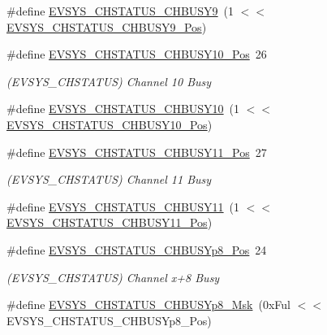 \begin{DoxyCompactItemize}
\#define \mbox{\hyperlink{group___s_a_m_d21___e_v_s_y_s_ga8ad1d75c07d64dc3f21cefb3f808aec1}{E\+V\+S\+Y\+S\+\_\+\+C\+H\+S\+T\+A\+T\+U\+S\+\_\+\+C\+H\+B\+U\+S\+Y9}}~(1 $<$$<$ \mbox{\hyperlink{group___s_a_m_d21___e_v_s_y_s_gaab28b2cfe9e5f4adcdd0537d485835e2}{E\+V\+S\+Y\+S\+\_\+\+C\+H\+S\+T\+A\+T\+U\+S\+\_\+\+C\+H\+B\+U\+S\+Y9\+\_\+\+Pos}})
\item 
\#define \mbox{\hyperlink{group___s_a_m_d21___e_v_s_y_s_gaef16f98ea1ecf706c13aaab54a8f89ee}{E\+V\+S\+Y\+S\+\_\+\+C\+H\+S\+T\+A\+T\+U\+S\+\_\+\+C\+H\+B\+U\+S\+Y10\+\_\+\+Pos}}~26
\begin{DoxyCompactList}\small\item\em (E\+V\+S\+Y\+S\+\_\+\+C\+H\+S\+T\+A\+T\+US) Channel 10 Busy \end{DoxyCompactList}\item 
\#define \mbox{\hyperlink{group___s_a_m_d21___e_v_s_y_s_ga1d8c6c70bd3bb364a53e98413c3f4a9a}{E\+V\+S\+Y\+S\+\_\+\+C\+H\+S\+T\+A\+T\+U\+S\+\_\+\+C\+H\+B\+U\+S\+Y10}}~(1 $<$$<$ \mbox{\hyperlink{group___s_a_m_d21___e_v_s_y_s_gaef16f98ea1ecf706c13aaab54a8f89ee}{E\+V\+S\+Y\+S\+\_\+\+C\+H\+S\+T\+A\+T\+U\+S\+\_\+\+C\+H\+B\+U\+S\+Y10\+\_\+\+Pos}})
\item 
\#define \mbox{\hyperlink{group___s_a_m_d21___e_v_s_y_s_gac35df61c7dbaba4a51ca27ce046f63a5}{E\+V\+S\+Y\+S\+\_\+\+C\+H\+S\+T\+A\+T\+U\+S\+\_\+\+C\+H\+B\+U\+S\+Y11\+\_\+\+Pos}}~27
\begin{DoxyCompactList}\small\item\em (E\+V\+S\+Y\+S\+\_\+\+C\+H\+S\+T\+A\+T\+US) Channel 11 Busy \end{DoxyCompactList}\item 
\#define \mbox{\hyperlink{group___s_a_m_d21___e_v_s_y_s_ga4d141cd748445ac8d2982ab72a2016ce}{E\+V\+S\+Y\+S\+\_\+\+C\+H\+S\+T\+A\+T\+U\+S\+\_\+\+C\+H\+B\+U\+S\+Y11}}~(1 $<$$<$ \mbox{\hyperlink{group___s_a_m_d21___e_v_s_y_s_gac35df61c7dbaba4a51ca27ce046f63a5}{E\+V\+S\+Y\+S\+\_\+\+C\+H\+S\+T\+A\+T\+U\+S\+\_\+\+C\+H\+B\+U\+S\+Y11\+\_\+\+Pos}})
\item 
\#define \mbox{\hyperlink{group___s_a_m_d21___e_v_s_y_s_gada12b1644128aac2e79ed2ba3faeab27}{E\+V\+S\+Y\+S\+\_\+\+C\+H\+S\+T\+A\+T\+U\+S\+\_\+\+C\+H\+B\+U\+S\+Yp8\+\_\+\+Pos}}~24
\begin{DoxyCompactList}\small\item\em (E\+V\+S\+Y\+S\+\_\+\+C\+H\+S\+T\+A\+T\+US) Channel x+8 Busy \end{DoxyCompactList}\item 
\#define \mbox{\hyperlink{group___s_a_m_d21___e_v_s_y_s_ga1cb9a317522810dfabdbbd733f260808}{E\+V\+S\+Y\+S\+\_\+\+C\+H\+S\+T\+A\+T\+U\+S\+\_\+\+C\+H\+B\+U\+S\+Yp8\+\_\+\+Msk}}~(0x\+Ful $<$$<$ E\+V\+S\+Y\+S\+\_\+\+C\+H\+S\+T\+A\+T\+U\+S\+\_\+\+C\+H\+B\+U\+S\+Yp8\+\_\+\+Pos)

\end{DoxyCompactItemize}
